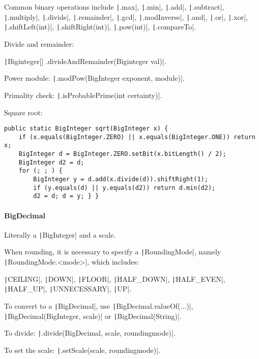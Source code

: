 Common binary operations include \texttt|.max|, \texttt|.min|, \texttt|.add|, \texttt|.subtract|, \texttt|.multiply|, \texttt|.divide|, \texttt|.remainder|, \texttt|.gcd|, \texttt|.modInverse|, \texttt|.and|, \texttt|.or|, \texttt|.xor|, \texttt|.shiftLeft(int)|, \texttt|.shiftRight(int)|, \texttt|.pow(int)|, \texttt|.compareTo|.

Divide and remainder:

\texttt|Biginteger[] .divideAndRemainder(Biginteger val)|.

Power module: \texttt|.modPow(BigInteger exponent, module)|.

Primality check: \texttt|.isProbablePrime(int certainty)|.

Square root:

\begin{verbatim}
public static BigInteger sqrt(BigInteger x) {
	if (x.equals(BigInteger.ZERO) || x.equals(BigInteger.ONE)) return x;
	BigInteger d = BigInteger.ZERO.setBit(x.bitLength() / 2);
	BigInteger d2 = d;
	for (; ; ) {
		BigInteger y = d.add(x.divide(d)).shiftRight(1);
		if (y.equals(d) || y.equals(d2)) return d.min(d2);
		d2 = d; d = y; } }
\end{verbatim}

\paragraph{BigDecimal}
Literally a \texttt|BigInteger| and a scale.

When rounding, it is necessary to specify a \texttt|RoundingMode|, namely \texttt|RoundingMode.<mode>|, which includes: 

\texttt|CEILING|, \texttt|DOWN|, \texttt|FLOOR|, \texttt|HALF_DOWN|, \texttt|HALF_EVEN|, \texttt|HALF_UP|, \texttt|UNNECESSARY|, \texttt|UP|.

To convert to a \texttt|BigDecimal|, use \texttt|BigDecimal.valueOf(...)|, \texttt|BigDecimal(BigInteger, scale)| or \texttt|BigDecimal(String)|.

To divide: \texttt|.divide(BigDecimal, scale, roundingmode)|.

To set the scale: \texttt|.setScale(scale, roundingmode)|.

